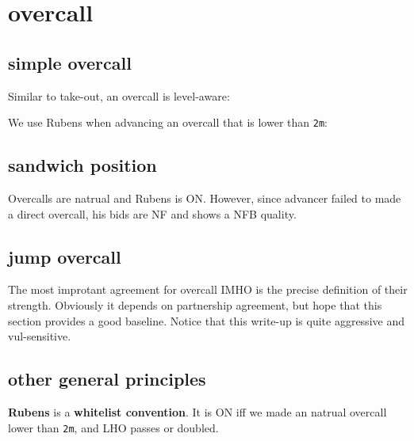 \section{overcall}

\subsection{simple overcall}

Similar to take-out, an overcall is level-aware:


We use Rubens when advancing an overcall that is lower than \texttt{2m}:




\subsection{sandwich position}

Overcalls are natrual and Rubens is ON. However, since advancer failed to made a direct overcall, his bids are NF and shows a NFB quality.


\subsection{jump overcall}

The most improtant agreement for overcall IMHO is the precise definition of their strength.
Obviously it depends on partnership agreement, but hope that this section provides a good baseline.
Notice that this write-up is quite aggressive and vul-sensitive.


\subsection{other general principles}

\textbf{Rubens} is a \textbf{whitelist convention}.
It is ON iff we made an natrual overcall lower than \texttt{2m}, and LHO passes or doubled.